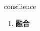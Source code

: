 
\begin{frame}
{\huge consilience}
\begin{center}
\begin{enumerate}\Large
  \item \textbf{融合}
\end{enumerate}
\end{center}
\end{frame}
